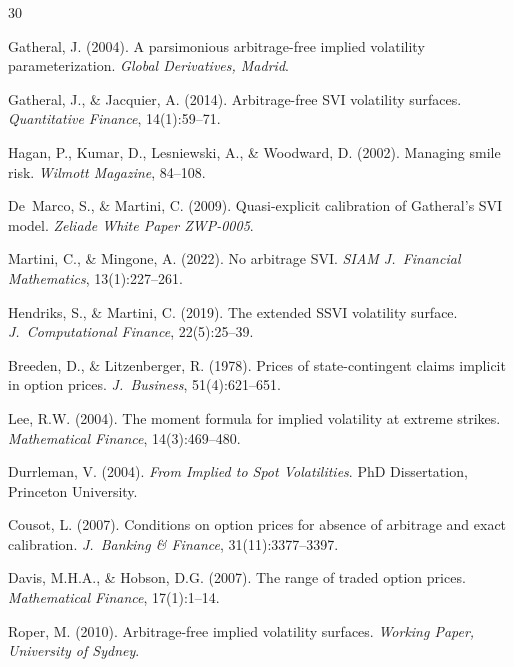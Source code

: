 \documentclass[11pt,a4paper]{article}
\begin{document}

\begin{thebibliography}{30}


Gatheral, J. (2004).
A parsimonious arbitrage-free implied volatility parameterization.
\emph{Global Derivatives, Madrid}.

Gatheral, J., \& Jacquier, A. (2014).
Arbitrage-free SVI volatility surfaces.
\emph{Quantitative Finance}, 14(1):59--71.

Hagan, P., Kumar, D., Lesniewski, A., \& Woodward, D. (2002).
Managing smile risk.
\emph{Wilmott Magazine}, 84--108.

De~Marco, S., \& Martini, C. (2009).
Quasi-explicit calibration of Gatheral's SVI model.
\emph{Zeliade White Paper ZWP-0005}.

Martini, C., \& Mingone, A. (2022).
No arbitrage SVI.
\emph{SIAM J.\ Financial Mathematics}, 13(1):227--261.

Hendriks, S., \& Martini, C. (2019).
The extended SSVI volatility surface.
\emph{J.\ Computational Finance}, 22(5):25--39.


Breeden, D., \& Litzenberger, R. (1978).
Prices of state-contingent claims implicit in option prices.
\emph{J.\ Business}, 51(4):621--651.

Lee, R.W. (2004).
The moment formula for implied volatility at extreme strikes.
\emph{Mathematical Finance}, 14(3):469--480.

Durrleman, V. (2004).
\emph{From Implied to Spot Volatilities}.
PhD Dissertation, Princeton University.

Cousot, L. (2007).
Conditions on option prices for absence of arbitrage and exact calibration.
\emph{J.\ Banking \& Finance}, 31(11):3377--3397.

Davis, M.H.A., \& Hobson, D.G. (2007).
The range of traded option prices.
\emph{Mathematical Finance}, 17(1):1--14.

Roper, M. (2010).
Arbitrage-free implied volatility surfaces.
\emph{Working Paper, University of Sydney}.


\end{thebibliography}
\end{document}
